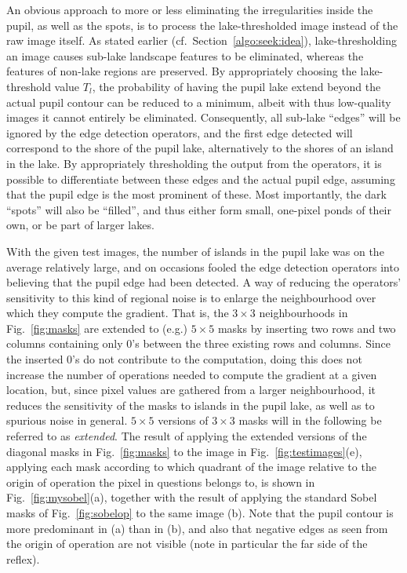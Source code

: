 An obvious approach to more or less eliminating the irregularities
inside the pupil, as well as the spots, is to process the
lake-thresholded image instead of the raw image itself.  As stated
earlier (cf.\ Section~\ref{algo:seek:idea}), lake-thresholding an
image causes sub-lake landscape features to be eliminated, whereas the
features of non-lake regions are preserved.  By appropriately choosing
the lake-threshold value $T_{l}$, the probability of having the pupil
lake extend beyond the actual pupil contour can be reduced to a
minimum, albeit with thus low-quality images it cannot entirely be
eliminated.  Consequently, all sub-lake ``edges'' will be ignored by
the edge detection operators, and the first edge detected will
correspond to the shore of the pupil lake, alternatively to the shores
of an island in the lake.  By appropriately thresholding the output
from the operators, it is possible to differentiate between these
edges and the actual pupil edge, assuming that the pupil edge is the
most prominent of these.  Most importantly, the dark ``spots'' will
also be ``filled'', and thus either form small, one-pixel ponds of
their own, or be part of larger lakes.

With the given test images, the number of islands in the pupil lake
was on the average relatively large, and on occasions fooled the edge
detection operators into believing that the pupil edge had been
detected.  A way of reducing the operators' sensitivity to this kind
of regional noise is to enlarge the neighbourhood over which they
compute the gradient.  That is, the $3\times 3$ neighbourhoods in
Fig.~\ref{fig:masks} are extended to (e.g.) $5\times 5$ masks by
inserting two rows and two columns containing only 0's between the
three existing rows and columns.  Since the inserted 0's do not
contribute to the computation, doing this does not increase the number
of operations needed to compute the gradient at a given location, but,
since pixel values are gathered from a larger neighbourhood, it
reduces the sensitivity of the masks to islands in the pupil lake, as
well as to spurious noise in general.  $5\times 5$ versions of
$3\times 3$ masks will in the following be referred to as {\em
  extended\/}.  The result of applying the extended versions of the
diagonal masks in Fig.~\ref{fig:masks} to the image in
Fig.~\ref{fig:testimages}(e), applying each mask according to which
quadrant of the image relative to the origin of operation the pixel in
questions belongs to, is shown in Fig.~\ref{fig:mysobel}(a), together
with the result of applying the standard Sobel masks of
Fig.~\ref{fig:sobelop} to the same image (b).  Note that the pupil
contour is more predominant in (a) than in (b), and also that negative
edges as seen from the origin of operation are not visible (note in
particular the far side of the reflex).

